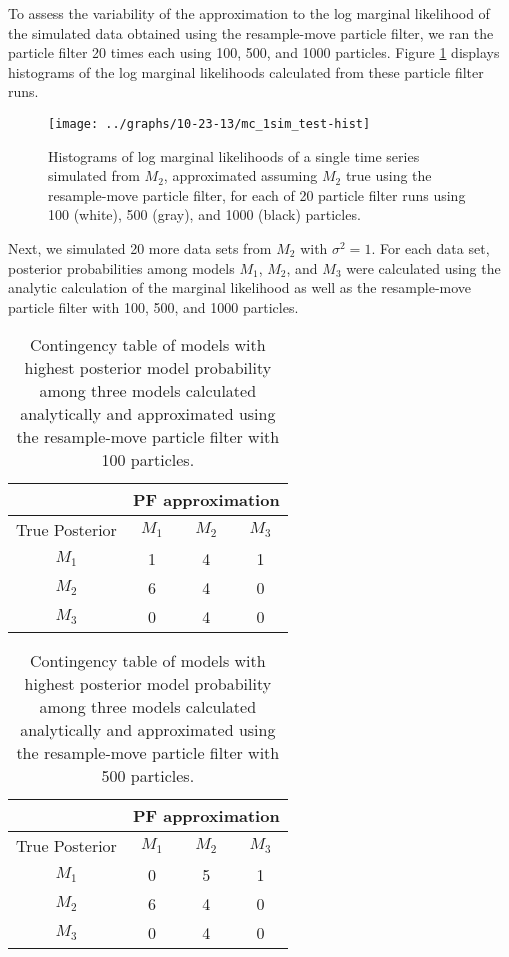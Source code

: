 \documentclass{article}
\begin{document}
To assess the variability of the approximation to the log marginal likelihood of the simulated data obtained using the resample-move particle filter, we ran the particle filter 20 times each using 100, 500, and 1000 particles. Figure \ref{fig:pf-hist} displays histograms of the log marginal likelihoods calculated from these particle filter runs.

\begin{figure}
\texttt{[image: ../graphs/10-23-13/mc\_1sim\_test-hist]}
\caption{Histograms of log marginal likelihoods of a single time series simulated from $M_2$, approximated assuming $M_2$ true using the resample-move particle filter, for each of 20 particle filter runs using 100 (white), 500 (gray), and 1000 (black) particles.} \label{fig:pf-hist}
\end{figure}

Next, we simulated 20 more data sets from $M_2$ with $\sigma^2 = 1$. For each data set, posterior probabilities among models $M_1$, $M_2$, and $M_3$ were calculated using the analytic calculation of the marginal likelihood as well as the resample-move particle filter with 100, 500, and 1000 particles.

\begin{table}
\begin{center}
\caption{Contingency table of models with highest posterior model probability among three models calculated analytically and approximated using the resample-move particle filter with 100 particles.} \label{tab:cont-tab5}
\begin{tabular}{|c|c|c|c|}
\hline
 & \multicolumn{3}{|c|}{PF approximation} \\
 \hline
 True Posterior & $M_1$& $M_2$ & $M_3$ \\
 \hline
$M_1$ &   1 &   4 &   1 \\
\hline
$M_2$ &   6 &   4 &   0 \\
\hline
$M_3$ &   0 &   4 &   0 \\
 \hline
\end{tabular}
\end{center}
\end{table}

\begin{table}
\begin{center}
\caption{Contingency table of models with highest posterior model probability among three models calculated analytically and approximated using the resample-move particle filter with 500 particles.} \label{tab:cont-tab10}
\begin{tabular}{|c|c|c|c|}
\hline
 & \multicolumn{3}{|c|}{PF approximation} \\
 \hline
 True Posterior & $M_1$& $M_2$ & $M_3$ \\
 \hline
$M_1$ &  0  &  5  &  1 \\
\hline
$M_2$ &  6  &  4  &  0 \\
\hline
$M_3$ &  0  &  4  &  0 \\
 \hline
\end{tabular}
\end{center}
\end{table}
\end{document}
